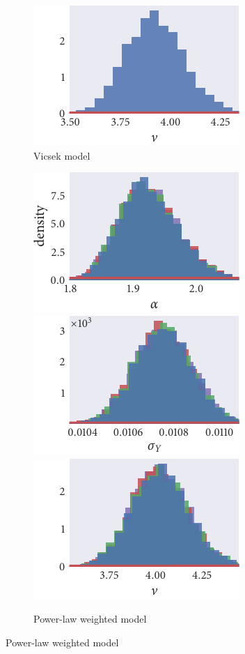 \begin{figure}[p]
\begin{subfigure}[b]{\textwidth}
    \includegraphics{seq1/r_hist_nu.pdf}
    \caption{Vicsek model}
    \label{subfig:posterior_seq1_vicsek}
  \end{subfigure}
  \begin{subfigure}[b]{\textwidth}
    \includegraphics{seq1/power_hist_alpha.pdf}%
    \includegraphics{seq1/power_hist_sigma_Y.pdf}%
    \includegraphics{seq1/power_hist_nu.pdf}
    \caption{Power-law weighted model}
    \label{subfig:posterior_seq1_power}

\end{subfigure}
\end{figure}
